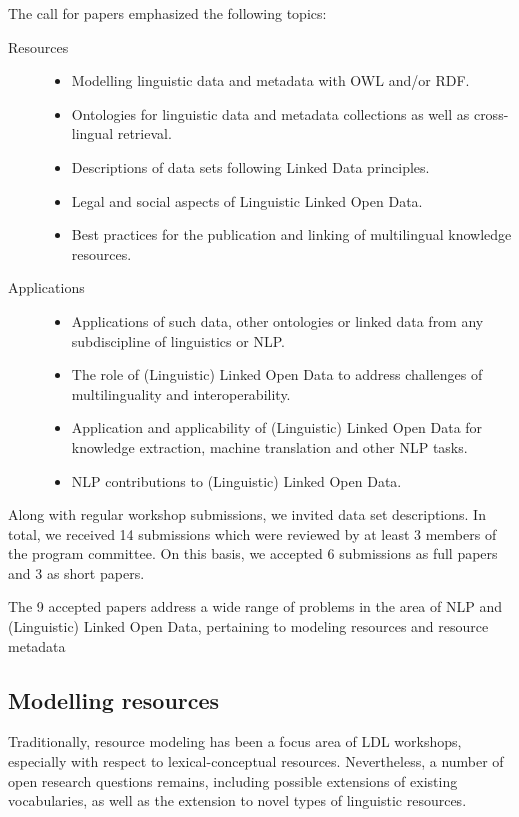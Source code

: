 The call for papers emphasized the following topics:

\begin{description}
\item[Resources]
	\begin{itemize}
	\item Modelling linguistic data and metadata with OWL and/or RDF.
    \item Ontologies for linguistic data and metadata collections as well as cross-lingual retrieval.
    \item Descriptions of data sets following Linked Data principles.
    \item Legal and social aspects of Linguistic Linked Open Data.
    \item Best practices for the publication and linking of multilingual knowledge resources.
	\end{itemize}
\item[Applications]
	\begin{itemize}
	\item Applications of such data, other ontologies or linked data from any subdiscipline of linguistics or NLP.
    \item The role of (Linguistic) Linked Open Data to address challenges of multilinguality and interoperability.
    \item Application and applicability of (Linguistic) Linked Open Data for knowledge extraction, machine translation and other NLP tasks.
    \item NLP contributions to (Linguistic) Linked Open Data.
	\end{itemize}
\end{description}

\noindent 
Along with regular workshop submissions, we invited data set descriptions.
In total, we received 14 submissions which were reviewed by at least 3 members of the program committee. 
On this basis, we accepted 6 submissions as full papers and 3 as short papers.

The 9 accepted papers address a wide range of problems in the area of NLP and (Linguistic) Linked Open Data, pertaining to modeling resources and resource metadata

\subsection{Modelling resources}

Traditionally, resource modeling has been a focus area of LDL workshops, especially with respect to lexical-conceptual resources. 
Nevertheless, a number of open research questions remains, including possible extensions of existing vocabularies, as well as the extension to novel types of linguistic resources.

